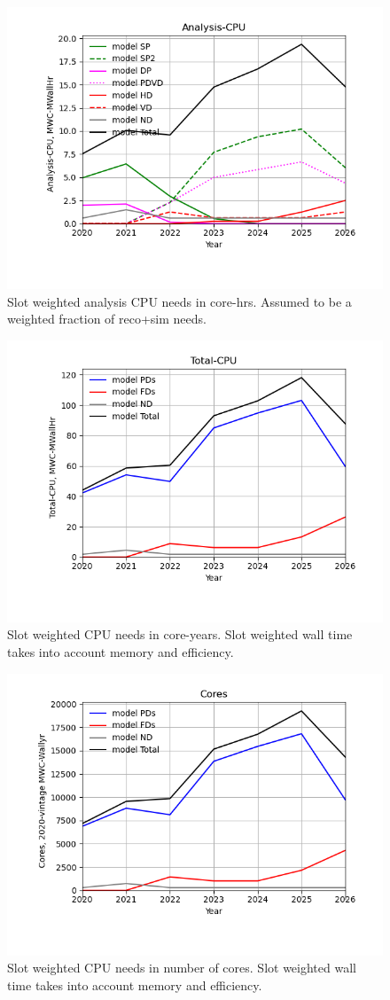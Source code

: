 \begin{figure}[h]
\centering\includegraphics[height=0.4\textwidth]{MoreSim_2022-12-04-2026/MoreSim_2022-12-04-2026-Analysis-CPU.png}
\caption{Slot weighted analysis CPU needs in core-hrs. Assumed to be a weighted fraction of reco+sim needs.}
\label{fig:Analysis-CPU}
\end{figure}
\begin{figure}[h]
\centering\includegraphics[height=0.4\textwidth]{MoreSim_2022-12-04-2026/MoreSim_2022-12-04-2026-Total-CPU.png}
\caption{Slot weighted CPU needs in core-years. Slot weighted wall time takes into account memory and efficiency.}
\label{fig:Total-CPU}
\end{figure}
\begin{figure}[h]
\centering\includegraphics[height=0.4\textwidth]{MoreSim_2022-12-04-2026/MoreSim_2022-12-04-2026-Cores.png}
\caption{Slot weighted CPU needs in number of cores. Slot weighted wall time takes into account memory and efficiency.}
\label{fig:Cores}
\end{figure}
